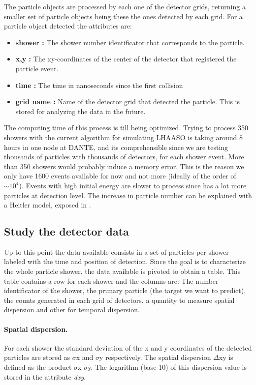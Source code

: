 \documentclass{article}
\begin{document}
The particle objects are processed by each one of the detector grids, returning a smaller set of particle objects being these the ones detected by each grid. For a  particle object detected the attributes are:
\begin{itemize}
    \item \textbf{shower :} The shower number identificator that corresponds to the particle.
    \item \textbf{x,y :} The xy-coordinates of the center of the detector that registered the particle event.
    \item \textbf{time :} The time in nanoseconds since the first collision
    \item \textbf{grid name :} Name of the detector grid that detected the particle. This is stored for analyzing the data in the future.
\end{itemize}

The computing time of this process is till being optimized. Trying to process 350 showers with the current algorithm for simulating LHAASO is taking around 8 hours in one node at DANTE, and its comprehensible since we are testing thousands of particles with thousands of detectors, for each shower event. More than 350 showers would probably induce a memory error. This is the reason we only have 1600 events available for now and not more (ideally of the order of $\sim 10^4$). Events with high initial energy are slower to process since has a lot more particles at detection level. The increase in particle number can be explained with a Heitler model, exposed in  \cite{heitlerarticle}.

\subsection{Study the detector data}
Up to this point the data available consists in a set of particles per shower labeled with the time and position of detection. Since the goal is to characterize the whole particle shower, the data available is pivoted to obtain a table. This table contains a row for each shower and the columns are: The number identificator of the shower, the primary particle (the target we want to predict), the counts generated in each grid of detectors,  a quantity to measure spatial dispersion and other for temporal dispersion.

\paragraph{Spatial dispersion.} For each shower the standard deviation of the x and y coordinates of the detected particles are stored as $\sigma$x and $\sigma$y respectively. The spatial dispersion $\Delta$xy is defined as the product $\sigma$x $ \sigma$y. The logarithm (base 10) of this dispersion value is stored in the attribute \emph{dxy}.
\end{document}
